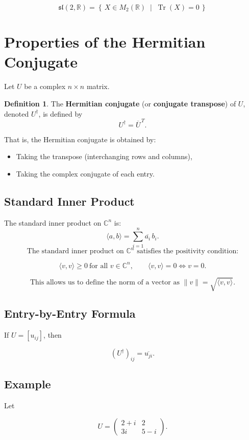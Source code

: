 \documentclass{article}
\theoremstyle{definition}
\newtheorem{definition}{Definition}[section]
\begin{document}
\[
\mathfrak{sl}(2,\mathbb{R})=\left\{\,X\in M_2(\mathbb{R}) \;\middle|\; \operatorname{Tr}(X)=0\,\right\}
\]

\section{Properties of the Hermitian Conjugate}

Let $U$ be a complex $n \times n$ matrix.

\begin{definition}
The \textbf{Hermitian conjugate} (or \textbf{conjugate transpose}) of $U$, denoted $U^\dagger$, is defined by
\[
U^\dagger = \overline{U}^{\,T}.
\]
\end{definition}

That is, the Hermitian conjugate is obtained by:

\begin{itemize}
    \item Taking the transpose (interchanging rows and columns),
    \item Taking the complex conjugate of each entry.
\end{itemize}
\subsection{Standard Inner Product}
The standard inner product on $\mathbb{C}^n$ is:
\[
\langle a,b\rangle=\sum_{i=1}^n \overline{a_i}\,b_i.
\]
\[
\text{The standard inner product on } \mathbb{C}^n \text{ satisfies the positivity condition:}
\]

\[
\langle v, v\rangle \ge 0 \ \text{for all } v\in\mathbb{C}^n,
\qquad
\langle v, v\rangle = 0 \iff v=0.
\]

\[
\text{This allows us to define the norm of a vector as }
\|v\|=\sqrt{\langle v,v\rangle}.
\]

\subsection*{Entry-by-Entry Formula}

If $U = [u_{ij}]$, then

\[
(U^\dagger)_{ij} = \overline{u_{ji}}.
\]

\subsection*{Example}

Let

\[
U =
\begin{pmatrix}
2 + i & 2 \\
3i & 5 - i
\end{pmatrix}.
\]
\end{document}
